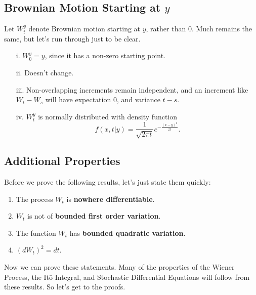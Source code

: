 \documentclass[a4paper,12pt]{scrartcl}
\begin{document}
\subsection{Brownian Motion Starting at $y$}

Let $W^y_t$ denote Brownian motion starting at $y$, rather than $0$. 
Much remains the same, but let's run through just to be clear.
\begin{enumerate}
   \item[i.]{$W^y_0 = y$, since it has a non-zero starting point.}
   \item[ii.]{Doesn't change.}
   \item[iii.]{Non-overlapping increments remain independent, and an
      increment like $W_t - W_s$ will have 
      expectation $0$, and variance $t - s$.}
   \item[iv.]{ $W^y_t$ is normally distributed with density function
      \[ f(x,t|y) = \frac{1}{\sqrt{2\pi t}} e^{-\frac{(x-y)^2}{2t}}.\]
      }
\end{enumerate}

\subsection{Additional Properties}

Before we prove the following results, let's just state them quickly:
\begin{enumerate}
   \item{The process $W_t$ is \textbf{nowhere differentiable}.}
   \item{$W_t$ is not of \textbf{bounded first order variation}.}
   \item{The function $W_t$ has \textbf{bounded quadratic
      variation}.}
   \item{$(dW_t)^2 = dt$.}
\end{enumerate}
Now we can prove these statements. Many of the properties of the Wiener
Process, the It\={o} Integral, and Stochastic Differential Equations 
will follow from these results. So let's get to the proofs.
\end{document}
